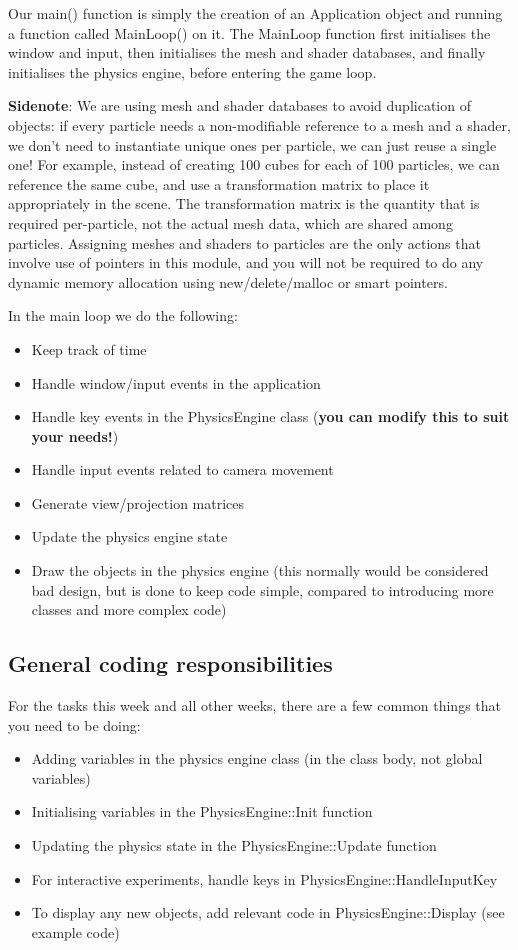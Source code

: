 \documentclass[12pt]{article}
\begin{document}
Our main() function is simply the creation of an Application object and running a function called MainLoop() on it. The MainLoop function first initialises the window and input, then initialises the mesh and shader databases, and finally initialises the physics engine, before entering the game loop. 

\textbf{Sidenote}: We are using mesh and shader databases to avoid duplication of objects: if every particle needs a non-modifiable reference to a mesh and a shader, we don't need to instantiate unique ones per particle, we can just reuse a single one! For example, instead of creating 100 cubes for each of 100 particles, we can reference the same cube, and use a transformation matrix to place it appropriately in the scene. The transformation matrix is the quantity that is required per-particle, not the actual mesh data, which are shared among particles. Assigning meshes and shaders to particles are the only actions that involve use of pointers in this module, and you will not be required to do any dynamic memory allocation using new/delete/malloc or smart pointers.

In the main loop we do the following:

\begin{itemize}
\item Keep track of time
\item Handle window/input events in the application
\item Handle key events in the PhysicsEngine class (\textbf{you can modify this to suit your needs!})
\item Handle input events related to camera movement
\item Generate view/projection matrices
\item Update the physics engine state
\item Draw the objects in the physics engine (this normally would be considered bad design, but is done to keep code simple, compared to introducing more classes and more complex code)
\end{itemize}

\subsection*{General coding responsibilities}

For the tasks this week and all other weeks, there are a few common things that you need to be doing:

\begin{itemize}
\item Adding variables in the physics engine class (in the class body, not global variables)
\item Initialising variables in the PhysicsEngine::Init function
\item Updating the physics state in the PhysicsEngine::Update function
\item For interactive experiments, handle keys in PhysicsEngine::HandleInputKey
\item To display any new objects, add relevant code in PhysicsEngine::Display (see example code)
\end{itemize}
\end{document}
